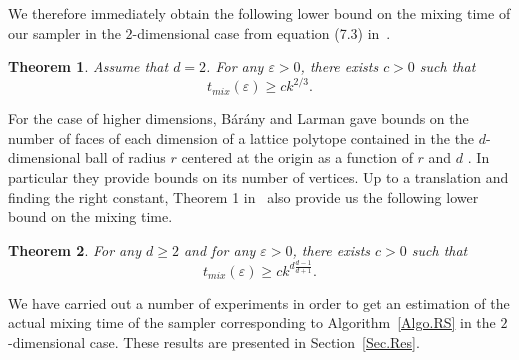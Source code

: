 \documentclass[a4paper]{article}
\newtheorem{theorem}{Theorem}
\begin{document}
We therefore immediately obtain the following lower bound on the mixing time of our sampler in the $2$-dimensional case from equation (7.3) in~\cite{levin2009markov}.

\begin{theorem}\label{Thm.Lowerbound}
Assume that $d=2$. For any $\varepsilon>0$, there exists $c>0$ such that
$$
t_{mix}(\varepsilon)\geq{ck^{2/3}}\mbox{.}
$$
\end{theorem}

For the case of higher dimensions,  B{\'a}r{\'a}ny and Larman gave bounds on the number of faces of each dimension of a lattice polytope contained in the the $d$-dimensional ball of radius $r$ centered at the origin as a function of $r$ and $d$ \cite{barany1998convex}. In particular they provide bounds on its number of vertices. Up to a translation and finding the right constant, Theorem 1 in~\cite{barany1998convex} also provide us the following lower bound on the mixing time.

\begin{theorem}
  For any $d\geq 2$ and for any $\varepsilon>0$, there exists $c>0$ such that
  $$
  t_{mix}(\varepsilon)\geq ck^{d \frac{d-1}{d+1}}\mbox{.}
  $$
\end{theorem}

We have carried out a number of experiments in order to get an estimation of the actual mixing time of the sampler corresponding to Algorithm~\ref{Algo.RS} in the $2$-dimensional case. These results are presented in Section~\ref{Sec.Res}.




\end{document}
